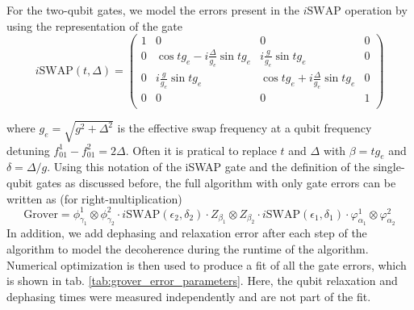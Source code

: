 For the two-qubit gates, we model the errors present in the $i\mathrm{SWAP}$ operation by using the representation of the gate
%
\begin{equation}
i\mathrm{SWAP}(t,\Delta) = \left(
			\begin{array}{cccc}
				1 & 0 & 0 & 0 \\
				0 & \cos{t g_{e}}-i\frac{\Delta}{g_{e}}\sin{t g_{e}} & i \frac{g}{g_e}\sin{t g_{e}} & 0 \\
				0 & i\frac{g}{g_e}\sin{t g_{e}} & \cos{t g_{e}}+i\frac{\Delta}{g_{e}}\sin{t g_{e}} & 0 \\
				0 & 0 & 0 & 1 \\
			\end{array}
	\right) \label{eq:swap_with_detuning}
\end{equation}
%


where $g_e = \sqrt{g^2+\Delta^2}$ is the effective swap frequency at a qubit frequency detuning $f_{01}^1-f_{01}^2 = 2\Delta$. Often it is pratical to replace $t$ and $\Delta$ with $\beta = t g_{e}$ and $\delta = \Delta / g$. Using this notation of the iSWAP gate and the definition of the single-qubit gates as discussed before, the full algorithm with only gate errors can be written as (for right-multiplication)
%
\begin{equation}
\mathrm{Grover} = \phi_{\gamma_1}^1\otimes \phi_{\gamma_2}^2\cdot i\mathrm{SWAP}(\epsilon_2,\delta_2)\cdot Z_{\beta_1}\otimes Z_{\beta_2}\cdot i\mathrm{SWAP}(\epsilon_1,\delta_1)\cdot\varphi_{\alpha_1}^1\otimes \varphi_{\alpha_2}^2 \label{eq:grover_error_model}
\end{equation}
%
In addition, we add dephasing and relaxation error after each step of the algorithm to model the decoherence during the runtime of the algorithm. Numerical optimization is then used to produce a fit of all the gate errors, which is shown in tab. \ref{tab:grover_error_parameters}. Here, the qubit relaxation and dephasing times were measured independently and are not part of the fit.

